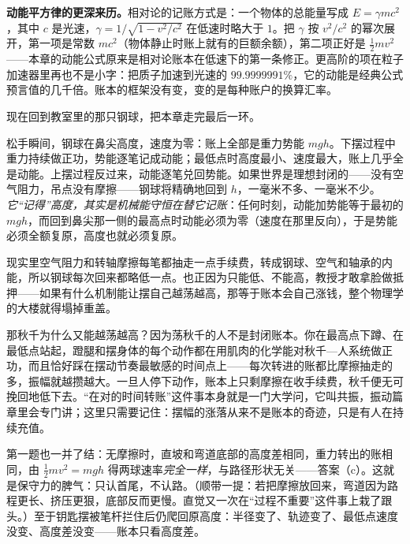 \begin{challenge}
\textbf{动能平方律的更深来历。}相对论的记账方式是：一个物体的总能量写成 \(E=\gamma mc^{2}\)，其中 \(c\) 是光速，\(\gamma=1/\sqrt{1-v^{2}/c^{2}}\) 在低速时略大于 \(1\)。把 \(\gamma\) 按 \(v^{2}/c^{2}\) 的幂次展开，第一项是常数 \(mc^{2}\)（物体静止时账上就有的巨额余额），第二项正好是 \(\frac{1}{2}mv^{2}\)——本章的动能公式原来是相对论账本在低速下的第一条修正。更高阶的项在粒子加速器里再也不是小字：把质子加速到光速的 \(99.9999991\%\)，它的动能是经典公式预言值的几千倍。账本的框架没有变，变的是每种账户的换算汇率。
\end{challenge}


现在回到教室里的那只钢球，把本章走完最后一环。

松手瞬间，钢球在鼻尖高度，速度为零：账上全部是重力势能 \(mgh\)。下摆过程中重力持续做正功，势能逐笔记成动能；最低点时高度最小、速度最大，账上几乎全是动能。上摆过程反过来，动能逐笔兑回势能。如果世界是理想封闭的——没有空气阻力，吊点没有摩擦——钢球将精确地回到 \(h\)，一毫米不多、一毫米不少。\emph{它“记得”高度，其实是机械能守恒在替它记账}：任何时刻，动能加势能等于最初的 \(mgh\)，而回到鼻尖那一侧的最高点时动能必须为零（速度在那里反向），于是势能必须全额复原，高度也就必须复原。

现实里空气阻力和转轴摩擦每笔都抽走一点手续费，转成钢球、空气和轴承的内能，所以钢球每次回来都略低一点。也正因为只能低、不能高，教授才敢拿脸做抵押——如果有什么机制能让摆自己越荡越高，那等于账本会自己涨钱，整个物理学的大楼就得塌掉重盖。

那秋千为什么又能越荡越高？因为荡秋千的人不是封闭账本。你在最高点下蹲、在最低点站起，蹬腿和摆身体的每个动作都在用肌肉的化学能对秋千—人系统做正功，而且恰好踩在摆动节奏最敏感的时间点上——每次转进的账都比摩擦抽走的多，振幅就越攒越大。一旦人停下动作，账本上只剩摩擦在收手续费，秋千便无可挽回地低下去。“在对的时间转账”这件事本身就是一门大学问，它叫共振，振动篇章里会专门讲；这里只需要记住：摆幅的涨落从来不是账本的奇迹，只是有人在持续充值。

第一题也一并了结：无摩擦时，直坡和弯道底部的高度差相同，重力转出的账相同，由 \(\frac{1}{2}mv^2=mgh\) 得两球速率\emph{完全一样}，与路径形状无关——答案（c）。这就是保守力的脾气：只认首尾，不认路。（顺带一提：若把摩擦放回来，弯道因为路程更长、挤压更狠，底部反而更慢。直觉又一次在“过程不重要”这件事上栽了跟头。）至于钥匙摆被笔杆拦住后仍爬回原高度：半径变了、轨迹变了、最低点速度没变、高度差没变——账本只看高度差。


